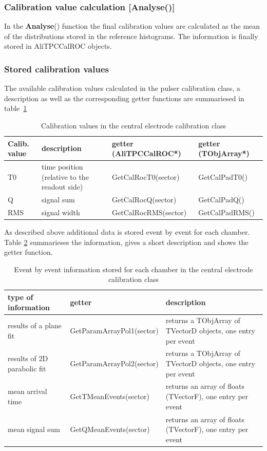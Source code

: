 \subsubsection{Calibration value calculation {\small [Analyse()]}}
In the {\bf Analyse}() function the final calibration values are calculated as the mean of the distributions stored in the reference histograms. The information is finally stored in AliTPCCalROC objects.

\subsubsection{Stored calibration values}
The available calibration values calculated in the pulser calibration class, a description as well as the corresponding getter functions are summariesed in table\ \ref{app:tab.ce}

\begin{table}[H]
  \centering
  \footnotesize
  \begin{tabular}{l|p{3.2cm}|l|l}
  \hline
{\bf Calib. value} & {\bf description} & {\bf getter} {\scriptsize (AliTPCCalROC*)} & {\bf getter} {\scriptsize (TObjArray*)}\\
  \hline
  \hline
  T0  & time position {\footnotesize (relative to the readout side)} & GetCalRocT0(sector) & GetCalPadT0() \\
  \hline
  Q   & signal sum          & GetCalRocQ(sector)    & GetCalPadQ() \\
  \hline
  RMS & signal width        & GetCalRocRMS(sector)  & GetCalPadRMS() \\
  \hline
  \end{tabular}
  \caption{Calibration values in the central electrode calibration class}
  \label{app:tab.ce}
\end{table}

As described above additional data is stored event by event for each chamber. Table \ref{app:tab.ceebye} summarieses the information, gives a short description and shows the getter function.
\begin{table}[H]
  \centering
  \footnotesize
  \begin{tabular}{p{4cm}|l|p{4cm}}
  \hline
{\bf type of information} & {\bf getter } & {\bf description} \\
\hline\hline
results of a plane fit  & GetParamArrayPol1(sector) & {\small returns a TObjArray of TVectorD objects, one entry per event}\\
\hline
results of 2D parabolic fit  & GetParamArrayPol2(sector) & {\small returns a TObjArray of TVectorD objects, one entry per event}\\
\hline
mean arrival time & GetTMeanEvents(sector) & returns an array of floats (TVectorF), one entry per event\\
\hline
mean signal sum & GetQMeanEvents(sector) & returns an array of floats (TVectorF), one entry per event\\
\hline
  \end{tabular}
  \caption{Event by event information stored for each chamber in the central electrode calibration class}
  \label{app:tab.ceebye}
\end{table}


